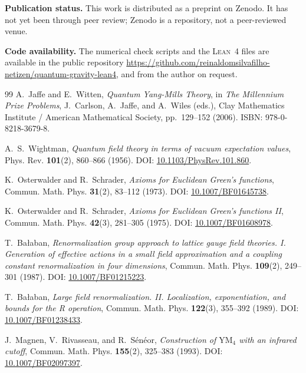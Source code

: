 \documentclass[11pt,a4paper]{amsart}
\theoremstyle{definition}
\begin{document}
\medskip\noindent\textbf{Publication status.} This work is distributed as a
preprint on Zenodo. It has not yet been through peer review; Zenodo is a
repository, not a peer-reviewed venue.

\medskip\noindent\textbf{Code availability.} The numerical check scripts and the
\textsc{Lean}~4 files are available in the public repository
\url{https://github.com/reinaldomsilvafilho-netizen/quantum-gravity-lean4}, and from the
author on request.

\begin{thebibliography}{99}
A.~Jaffe and E.~Witten, \emph{Quantum Yang-Mills Theory}, in \emph{The Millennium Prize Problems}, J.~Carlson, A.~Jaffe, and A.~Wiles (eds.), Clay Mathematics Institute / American Mathematical Society, pp.~129--152 (2006). ISBN: 978-0-8218-3679-8.

A.~S.~Wightman, \emph{Quantum field theory in terms of vacuum expectation values}, Phys. Rev. \textbf{101}(2), 860--866 (1956). DOI: \href{https://doi.org/10.1103/PhysRev.101.860}{10.1103/PhysRev.101.860}.

K.~Osterwalder and R.~Schrader, \emph{Axioms for Euclidean Green's functions}, Commun. Math. Phys. \textbf{31}(2), 83--112 (1973). DOI: \href{https://doi.org/10.1007/BF01645738}{10.1007/BF01645738}.

K.~Osterwalder and R.~Schrader, \emph{Axioms for Euclidean Green's functions II}, Commun. Math. Phys. \textbf{42}(3), 281--305 (1975). DOI: \href{https://doi.org/10.1007/BF01608978}{10.1007/BF01608978}.

T.~Ba\l{}aban, \emph{Renormalization group approach to lattice gauge field theories. I. Generation of effective actions in a small field approximation and a coupling constant renormalization in four dimensions}, Commun. Math. Phys. \textbf{109}(2), 249--301 (1987). DOI: \href{https://doi.org/10.1007/BF01215223}{10.1007/BF01215223}.

T.~Ba\l{}aban, \emph{Large field renormalization. II. Localization, exponentiation, and bounds for the R operation}, Commun. Math. Phys. \textbf{122}(3), 355--392 (1989). DOI: \href{https://doi.org/10.1007/BF01238433}{10.1007/BF01238433}.

J.~Magnen, V.~Rivasseau, and R.~S\'en\'eor, \emph{Construction of $\mathrm{YM}_4$ with an infrared cutoff}, Commun. Math. Phys. \textbf{155}(2), 325--383 (1993). DOI: \href{https://doi.org/10.1007/BF02097397}{10.1007/BF02097397}.


\end{thebibliography}
\end{document}
